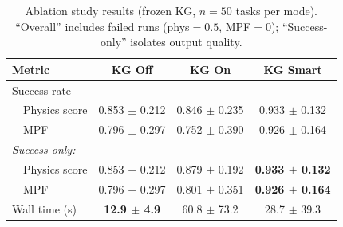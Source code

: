 \begin{table}[htbp]
\centering
\caption{Ablation study results (frozen KG, $n=50$ tasks per mode). ``Overall'' includes failed runs (phys${}=0.5$, MPF${}=0$); ``Success-only'' isolates output quality.}
\label{tab:ablation-v2}
\small
\setlength{\tabcolsep}{4pt}
\begin{tabular}{lccc}
\toprule
Metric & \textbf{KG Off} & \textbf{KG On} & \textbf{KG Smart} \\
\midrule
Success rate & \textbf{100%
\multicolumn{4}{l}{\textit{Overall (all tasks):}} \\
~~Physics score & 0.853 $\pm$ 0.212 & 0.846 $\pm$ 0.235 & 0.933 $\pm$ 0.132 \\
~~MPF & 0.796 $\pm$ 0.297 & 0.752 $\pm$ 0.390 & 0.926 $\pm$ 0.164 \\[2pt]
\multicolumn{4}{l}{\textit{Success-only:}} \\
~~Physics score & 0.853 $\pm$ 0.212 & 0.879 $\pm$ 0.192 & \textbf{0.933 $\pm$ 0.132} \\
~~MPF & 0.796 $\pm$ 0.297 & 0.801 $\pm$ 0.351 & \textbf{0.926 $\pm$ 0.164} \\[2pt]
Wall time (s) & \textbf{12.9 $\pm$ 4.9} & 60.8 $\pm$ 73.2 & 28.7 $\pm$ 39.3 \\
\bottomrule
\end{tabular}
\end{table}